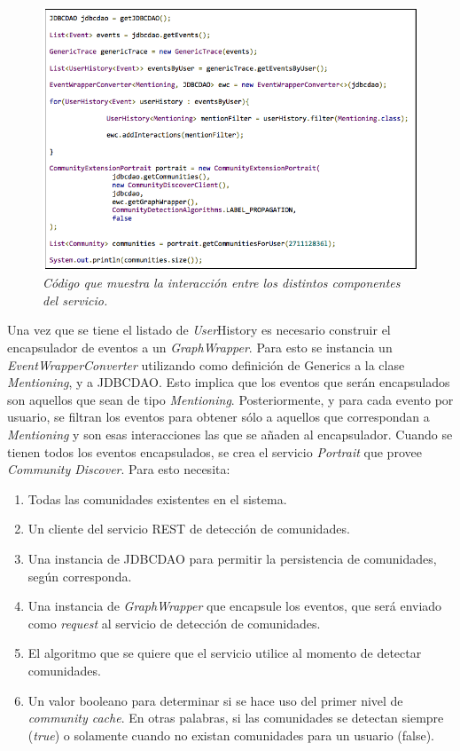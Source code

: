 \begin{figure}[H]
  \centering
  \includegraphics[scale=.6]{images/Figura4-4}
  \caption{\em Código que muestra la interacción entre los distintos componentes del servicio.}
  \label{fig:arq-im4}
\end{figure}


Una vez que se tiene el listado de \textit{User}History es necesario construir el encapsulador de eventos a un \textit{\textit{Graph}Wrapper}. Para esto se instancia un \textit{\textit{Event}WrapperConverter} utilizando como definición de Generics a la clase \textit{Mentioning}, y a JDBCDAO. Esto implica que los eventos que serán encapsulados son aquellos que sean de tipo \textit{Mentioning}.  Posteriormente, y para cada evento por usuario, se filtran los eventos para obtener sólo a aquellos que correspondan a \textit{Mentioning} y son esas interacciones las que se añaden al encapsulador. Cuando se tienen todos los eventos encapsulados, se crea el servicio \textit{Portrait} que provee \textit{Community Discover}. Para esto necesita:

\begin{enumerate}
  \item Todas las comunidades existentes en el sistema.
  \item Un cliente del servicio REST de detección de comunidades.
  \item Una instancia de JDBCDAO para permitir la persistencia de comunidades, según corresponda.
  \item Una instancia de \textit{\textit{Graph}Wrapper} que encapsule los eventos, que será enviado como \textit{request} al servicio de detección de comunidades.
  \item El algoritmo que se quiere que el servicio utilice al momento de detectar comunidades.
  \item Un valor booleano para determinar si se hace uso del primer nivel de \textit{community cache}. En otras palabras, si las comunidades se detectan siempre (\textit{true}) o solamente cuando no existan comunidades para un usuario (false).
\end{enumerate}

